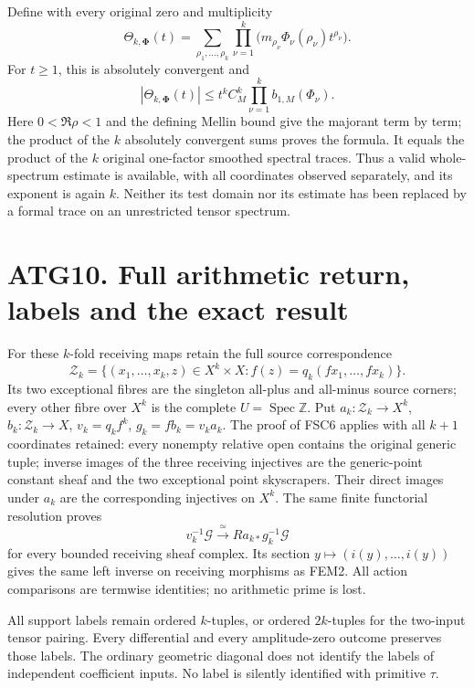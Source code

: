 Define with every original zero and multiplicity \[
\Theta_{k,\boldsymbol\Phi}(t)=
\sum_{\rho_1,\ldots,\rho_k}
 \prod_{\nu=1}^k
 \bigl(m_{\rho_\nu}\Phi_\nu(\rho_\nu)t^{\rho_\nu}\bigr).
\tag{ATG9.1}
\] For \(t\ge1\), this is absolutely convergent and \[
\boxed{|\Theta_{k,\boldsymbol\Phi}(t)|
 \le t^k C_M^k
 \prod_{\nu=1}^k b_{1,M}(\Phi_\nu).}
\tag{ATG9.2}
\] Here \(0<\Re\rho<1\) and the defining Mellin bound give the majorant
term by term; the product of the \(k\) absolutely convergent sums proves
the formula. It equals the product of the \(k\) original one-factor
smoothed spectral traces. Thus a valid whole-spectrum estimate is
available, with all coordinates observed separately, and its exponent is
again \(k\). Neither its test domain nor its estimate has been replaced
by a formal trace on an unrestricted tensor spectrum.

\section{ATG10. Full arithmetic return, labels and the exact
result}\label{atg10.-full-arithmetic-return-labels-and-the-exact-result}

For these \(k\)-fold receiving maps retain the full source
correspondence \[
\mathcal Z_k=
\{(x_1,\ldots,x_k,z)\in X^k\times X:
 f(z)=q_k(fx_1,\ldots,fx_k)\}.
\] Its two exceptional fibres are the singleton all-plus and all-minus
source corners; every other fibre over \(X^k\) is the complete
\(U=\operatorname{Spec}\mathbb Z\). Put \(a_k:\mathcal Z_k\to X^k\),
\(b_k:\mathcal Z_k\to X\), \(v_k=q_k f^k\), \(g_k=fb_k=v_ka_k\). The
proof of FSC6 applies with all \(k+1\) coordinates retained: every
nonempty relative open contains the original generic tuple; inverse
images of the three receiving injectives are the generic-point constant
sheaf and the two exceptional point skyscrapers. Their direct images
under \(a_k\) are the corresponding injectives on \(X^k\). The same
finite functorial resolution proves \[
v_k^{-1}\mathcal G\xrightarrow{\ \simeq\ }
Ra_{k*}g_k^{-1}\mathcal G
\tag{ATG10.1}
\] for every bounded receiving sheaf complex. Its section
\(y\mapsto(i(y),\ldots,i(y))\) gives the same left inverse on receiving
morphisms as FEM2. All action comparisons are termwise identities; no
arithmetic prime is lost.

All support labels remain ordered \(k\)-tuples, or ordered \(2k\)-tuples
for the two-input tensor pairing. Every differential and every
amplitude-zero outcome preserves those labels. The ordinary geometric
diagonal does not identify the labels of independent coefficient inputs.
No label is silently identified with primitive \(\tau\).

